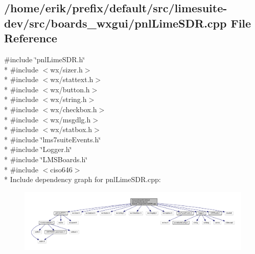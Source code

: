 \subsection{/home/erik/prefix/default/src/limesuite-\/dev/src/boards\+\_\+wxgui/pnl\+Lime\+S\+DR.cpp File Reference}
\label{pnlLimeSDR_8cpp}
{\ttfamily \#include \char`\"{}pnl\+Lime\+S\+D\+R.\+h\char`\"{}}\\*
{\ttfamily \#include $<$wx/sizer.\+h$>$}\\*
{\ttfamily \#include $<$wx/stattext.\+h$>$}\\*
{\ttfamily \#include $<$wx/button.\+h$>$}\\*
{\ttfamily \#include $<$wx/string.\+h$>$}\\*
{\ttfamily \#include $<$wx/checkbox.\+h$>$}\\*
{\ttfamily \#include $<$wx/msgdlg.\+h$>$}\\*
{\ttfamily \#include $<$wx/statbox.\+h$>$}\\*
{\ttfamily \#include \char`\"{}lms7suite\+Events.\+h\char`\"{}}\\*
{\ttfamily \#include \char`\"{}Logger.\+h\char`\"{}}\\*
{\ttfamily \#include \char`\"{}L\+M\+S\+Boards.\+h\char`\"{}}\\*
{\ttfamily \#include $<$ciso646$>$}\\*
Include dependency graph for pnl\+Lime\+S\+D\+R.\+cpp\+:
\nopagebreak
\begin{figure}[H]
\begin{center}
\leavevmode
\includegraphics[width=350pt]{d3/d37/pnlLimeSDR_8cpp__incl}
\end{center}
\end{figure}

